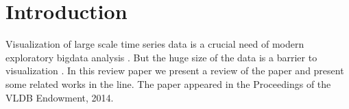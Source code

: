 \section{Introduction} \label{intro}
Visualization of large scale time series data is a crucial need of modern exploratory
bigdata analysis \cite{fu2011review}. But the huge size of the data is a barrier to visualization \cite{labrinidis2012challenges,fan2014challenges,chen2014data}. 
In this review paper we present a review of the paper \cite{jugel2014m4} and present some related works in the line.  The paper appeared in the Proceedings of the VLDB Endowment, 2014. 